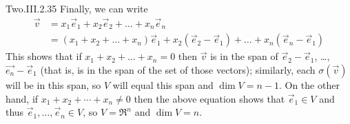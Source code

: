 \begin{ans}{Two.III.2.35}
      Finally, we can write
      \begin{align*}
        \vec{v} &=x_1\vec{e}_1+x_2\vec{e}_2+\dots+x_n\vec{e}_n  \\
                &=(x_1+x_2+\dots+x_n)\vec{e}_1+x_2(\vec{e}_2-\vec{e}_1)+\dots
                   +x_n(\vec{e}_n-\vec{e}_1)
      \end{align*}
      This shows that if $x_1+x_2+\dots+x_n=0$ then $\vec{v}$ is in the span
      of $\vec{e}_2-\vec{e}_1$, \ldots, $\vec{e_n}-\vec{e}_1$ (that is, is in
      the span of the set of those vectors); similarly, each $\sigma(\vec{v})$
      will be in this span, so $V$ will equal this span and $\dim V=n-1$.
      On the other hand, if $x_1+x_2+\cdots+x_n\neq 0$ then the above equation
      shows that $\vec{e}_1\in V$ and thus $\vec{e}_1,\dots,\vec{e}_n\in V$,
      so $V=\Re^n$ and $\dim V=n$.
    
\end{ans}
